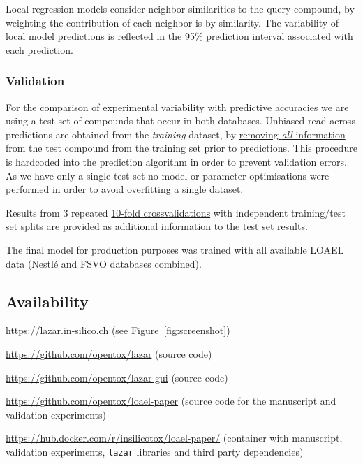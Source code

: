 \documentclass[]{achemso}
\providecommand{\tightlist}{%
  \setlength{\itemsep}{0pt}\setlength{\parskip}{0pt}}
\begin{document}
Local regression models consider neighbor similarities to the query
compound, by weighting the contribution of each neighbor is by
similarity. The variability of local model predictions is reflected in
the 95\% prediction interval associated with each prediction.

\subsubsection{Validation}\label{validation}

For the comparison of experimental variability with predictive
accuracies we are using a test set of compounds that occur in both
databases. Unbiased read across predictions are obtained from the
\emph{training} dataset, by
\href{https://github.com/opentox/lazar/blob/loael-paper.submission/lib/model.rb\#L234-L238}{removing
\emph{all} information} from the test compound from the training set
prior to predictions. This procedure is hardcoded into the prediction
algorithm in order to prevent validation errors. As we have only a
single test set no model or parameter optimisations were performed in
order to avoid overfitting a single dataset.

Results from 3 repeated
\href{https://github.com/opentox/lazar/blob/loael-paper.submission/lib/crossvalidation.rb\#L85-L93}{10-fold
crossvalidations} with independent training/test set splits are provided
as additional information to the test set results.

The final model for production purposes was trained with all available
LOAEL data (Nestlé and FSVO databases combined).

\subsection{Availability}\label{availability}

\begin{description}
\tightlist
\item[Public webinterface]
\url{https://lazar.in-silico.ch} (see Figure~\ref{fig:screenshot})
\item[\texttt{lazar} framework]
\url{https://github.com/opentox/lazar} (source code)
\item[\texttt{lazar} GUI]
\url{https://github.com/opentox/lazar-gui} (source code)
\item[Manuscript]
\url{https://github.com/opentox/loael-paper} (source code for the
manuscript and validation experiments)
\item[Docker image]
\url{https://hub.docker.com/r/insilicotox/loael-paper/} (container with
manuscript, validation experiments, \texttt{lazar} libraries and third
party dependencies)
\end{description}
\end{document}
